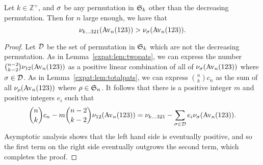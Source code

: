   \begin{proposition}
    Let $k \in \mathbb{Z}^+$, and $\sg$ be any permutation in $\S_k$
    other than the decreasing permutation. Then for $n$ large enough,
    we have that
    $$\num_{k \dots 3 2 1}(\Avn) > \num_{\sg}(\Avn).$$
  \end{proposition}

  \begin{proof}
    Let $\cD$ be the set of permutation in $\S_k$ which are not the
    decreasing permutation.  As in Lemma~\ref{expat:lem:twopats},  we can
    express the number $\binom{n-2}{k-2}\num_{12}(\Avn)$ as a positive linear
    combination of all of $\num_{\sg} (\Avn)$ where $\sg \in \cD$. As in
    Lemma~\ref{expat:lem:totalpats}, we can express $\binom{n}{k} c_n$ as the sum
    of all $\num_{\ro} (\Avn)$ where $\ro \in \S_n$.  It follows that there is
    a positive integer $m$ and positive
    integers $e_i$ such that
    $$ \binom{n}{k} c_n - m\binom{n-2}{k-2} \num_{12} (\Avn) = \num_{k \dots
    321} - \sum_{\sg \in \cD} e_i \num_{\sg} (\Avn).$$ Asymptotic analysis
    shows that the left hand side is eventually positive, and so the first term
    on the right side eventually outgrows the second term, which completes the
    proof.
  \end{proof}

